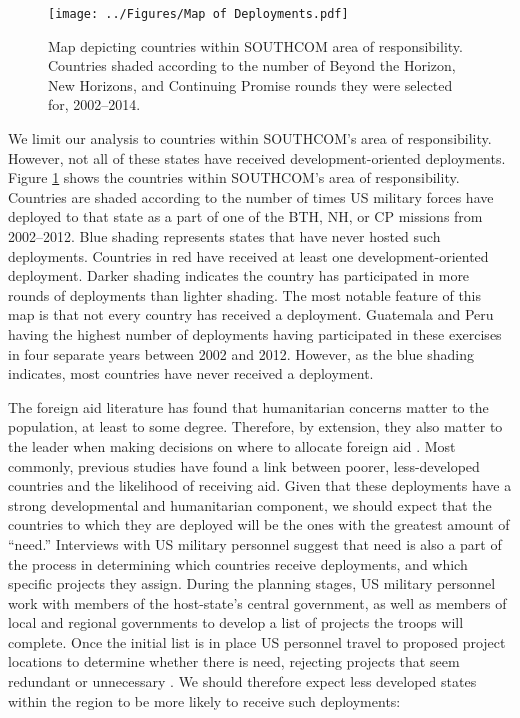 \documentclass[12pt]{article}
\begin{document}
\begin{doublespace}
\begin{figure}[t]
\begin{center}
\texttt{[image: ../Figures/Map of Deployments.pdf]}
\caption{Map depicting countries within SOUTHCOM area of responsibility. Countries shaded according to the number of Beyond the Horizon, New Horizons, and Continuing Promise rounds they were selected for, 2002--2014.}
\label{fig:map1}
\end{center}
\end{figure}

We limit our analysis to countries within SOUTHCOM's area of responsibility. However, not all of these states have received development-oriented deployments. Figure \ref{fig:map1} shows the countries within SOUTHCOM's area of responsibility. Countries are shaded according to the number of times US military forces have deployed to that state as a part of one of the BTH, NH, or CP missions from 2002--2012. Blue shading represents states that have never hosted such deployments. Countries in red have received at least one development-oriented deployment. Darker shading indicates the country has participated in more rounds of deployments than lighter shading. The most notable feature of this map is that not every country has received a deployment. Guatemala and Peru having the highest number of deployments having participated in these exercises in four separate years between 2002 and 2012. However, as the blue shading indicates, most countries have never received a deployment. 
 
The foreign aid literature has found that humanitarian concerns matter to the population, at least to some degree. Therefore, by extension, they also matter to the leader when making decisions on where to allocate foreign aid \cite{AlesinaDollar2000,drury2005politics,lumsdaine1993moral,van2004media}. Most commonly, previous studies have found a link between poorer, less-developed countries and the likelihood of receiving aid. Given that these deployments have a strong developmental and humanitarian component, we should expect that the countries to which they are deployed will be the ones with the greatest amount  of ``need.'' Interviews with US military personnel suggest that need is also a part of the process in determining which countries receive deployments, and which specific projects they assign. During the planning stages, US military personnel work with members of the host-state's central government, as well as members of local and regional governments to develop a list of projects the troops will complete. Once the initial list is in place US personnel travel to proposed project locations to determine whether there is need, rejecting projects that seem redundant or unnecessary \cite{CPT20160309}.  We should therefore expect less developed states within the region to be more likely to receive such deployments: 


\end{doublespace}
\end{document}
